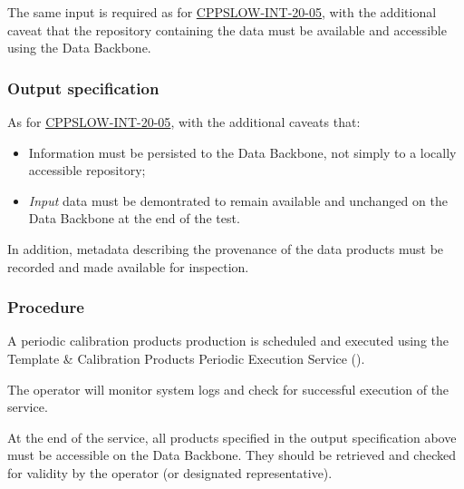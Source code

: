 The same input is required as for
\hyperref[cppslow-int-20-05]{CPPSLOW-INT-20-05}, with the additional caveat
that the repository containing the data must be available and accessible using
the Data Backbone.

\subsubsection{Output specification}

As for \hyperref[cppslow-int-20-05]{CPPSLOW-INT-20-05}, with the additional
caveats that:

\begin{itemize}

  \item{Information must be persisted to the Data Backbone, not simply to a
  locally accessible repository;}

  \item{\textit{Input} data must be demontrated to remain available and
  unchanged on the Data Backbone at the end of the test.}

\end{itemize}

In addition, metadata describing the provenance of the data products must be
recorded and made available for inspection.

\subsubsection{Procedure}

A periodic calibration products production is scheduled and executed using the
Template \& Calibration Products Periodic Execution Service
().

The operator will monitor system logs and check for successful execution of
the service.

At the end of the service, all products specified in the output specification
above must be accessible on the Data Backbone. They should be retrieved and
checked for validity by the operator (or designated representative).
